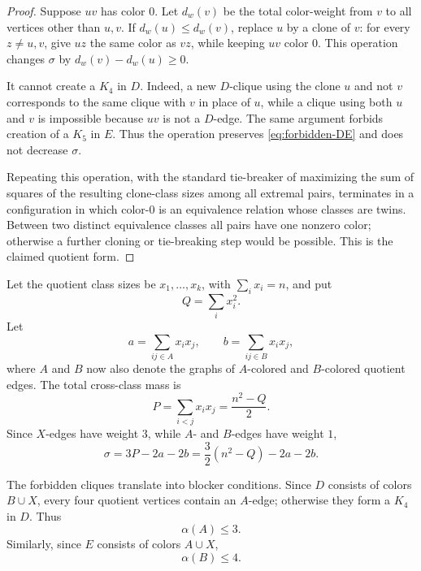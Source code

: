 \documentclass[12pt]{article}
\theoremstyle{plain}
\theoremstyle{definition}
\theoremstyle{remark}
\begin{document}
\begin{proof}
Suppose \(uv\) has color \(0\).  Let \(d_w(v)\) be the total color-weight from
\(v\) to all vertices other than \(u,v\).  If \(d_w(u)\le d_w(v)\), replace
\(u\) by a clone of \(v\): for every \(z\ne u,v\), give \(uz\) the same color
as \(vz\), while keeping \(uv\) color \(0\).  This operation changes \(\sigma\)
by \(d_w(v)-d_w(u)\ge0\).

It cannot create a \(K_4\) in \(D\).  Indeed, a new \(D\)-clique using the
clone \(u\) and not \(v\) corresponds to the same clique with \(v\) in place of
\(u\), while a clique using both \(u\) and \(v\) is impossible because \(uv\) is
not a \(D\)-edge.  The same argument forbids creation of a \(K_5\) in \(E\).
Thus the operation preserves \eqref{eq:forbidden-DE} and does not decrease
\(\sigma\).

Repeating this operation, with the standard tie-breaker of maximizing the sum
of squares of the resulting clone-class sizes among all extremal pairs,
terminates in a configuration in which color-\(0\) is an equivalence relation
whose classes are twins.  Between two distinct equivalence classes all pairs
have one nonzero color; otherwise a further cloning or tie-breaking step would
be possible.  This is the claimed quotient form.
\end{proof}

Let the quotient class sizes be \(x_1,\ldots,x_k\), with
\(\sum_i x_i=n\), and put
\[
  Q=\sum_i x_i^2.
\]
Let
\[
  a=\sum_{ij\in A}x_i x_j,
  \qquad
  b=\sum_{ij\in B}x_i x_j,
\]
where \(A\) and \(B\) now also denote the graphs of \(A\)-colored and
\(B\)-colored quotient edges.  The total cross-class mass is
\[
  P=\sum_{i<j}x_i x_j=\frac{n^2-Q}{2}.
\]
Since \(X\)-edges have weight \(3\), while \(A\)- and \(B\)-edges have weight
\(1\),
\begin{equation}\label{eq:sigma-quotient}
  \sigma=3P-2a-2b=\frac32(n^2-Q)-2a-2b.
\end{equation}

The forbidden cliques translate into blocker conditions.  Since
\(D\) consists of colors \(B\cup X\), every four quotient vertices contain an
\(A\)-edge; otherwise they form a \(K_4\) in \(D\).  Thus
\begin{equation}\label{eq:alphaA}
  \alpha(A)\le3.
\end{equation}
Similarly, since \(E\) consists of colors \(A\cup X\),
\begin{equation}\label{eq:alphaB}
  \alpha(B)\le4.
\end{equation}
\end{document}
